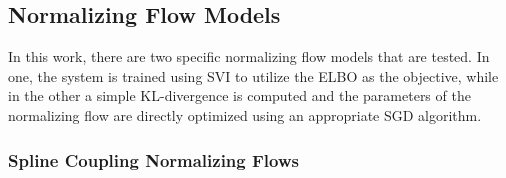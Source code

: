 \subsection{Normalizing Flow Models}
In this work, there are two specific normalizing flow models that are tested. In one, the system is trained using SVI to utilize the ELBO as the objective, while in the other a simple KL-divergence is computed and the parameters of the normalizing flow are directly optimized using an appropriate SGD algorithm.

\subsubsection{Spline Coupling Normalizing Flows}
